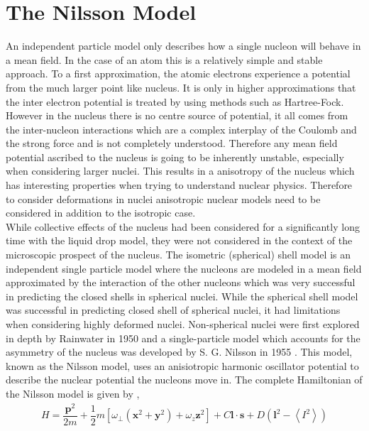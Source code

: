 \documentclass[10pt,a4paper, twoside, openright]{report}
\begin{document}
\section{The Nilsson Model}
An independent particle model only describes how a single nucleon will behave in a mean field. In the case of an atom this is a relatively simple and stable approach. To a first approximation, the atomic electrons experience a potential from the much larger point like nucleus. It is only in higher approximations that  the inter electron potential is treated by using methods such as Hartree-Fock. However in the nucleus there is no centre source of potential, it all comes from the inter-nucleon interactions which are a complex interplay of the Coulomb and the strong force and is not completely understood. Therefore any mean field potential ascribed to the nucleus is going to be inherently unstable, especially when considering larger nuclei. This results in a anisotropy of the nucleus which has interesting properties when trying to understand nuclear physics. Therefore to consider deformations in nuclei anisotropic nuclear models need to be considered in addition to the isotropic case. \\
\linebreak
While collective effects of the nucleus had been considered for a significantly long time with the liquid drop model, they were not considered in the context of the microscopic prospect of the nucleus\cite{Brix1986}. The isometric (spherical) shell model is an independent single particle model where the nucleons are modeled in a mean field approximated by the interaction of the other nucleons which was very successful in predicting the closed shells in spherical nuclei\cite{Mayer1949, Jensen1949}. While the spherical shell model was successful in predicting closed shell of spherical nuclei, it had limitations when considering highly deformed nuclei. Non-spherical nuclei were first explored in depth by Rainwater in 1950 \cite{Rainwater1950} and a single-particle model which accounts for the asymmetry of the nucleus was developed by S. G. Nilsson in 1955 \cite{Nilsson1955}. This model, known as the Nilsson model, uses an anisiotropic harmonic oscillator potential to describe the nuclear potential the nucleons move in. The complete Hamiltonian of the Nilsson model is given by \cite{Nilsson1955, Gustafson1967},
\begin{align} \label{eq:NilssonHamiltonian}
H = \dfrac{\textbf{p}^2}{2m} + \dfrac{1}{2}m \left[\omega_{\perp}\left(\textbf{x}^2 + \textbf{y}^2\right) + \omega_z \textbf{z}^2\right] + C\textbf{l}\cdot \textbf{s} + D \left(\textbf{l}^2 - \left<I^2\right>\right)
\end{align}
\end{document}

